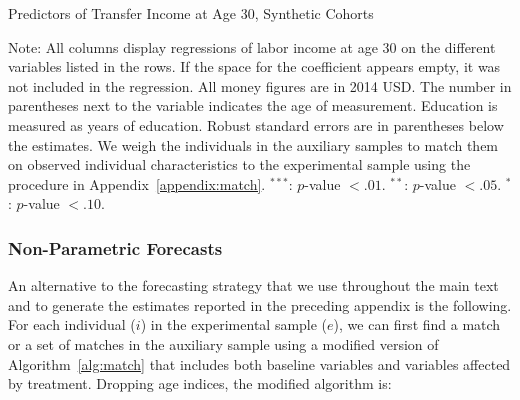 \begin{table}[H]
\begin{threeparttable}
\caption{Predictors of Transfer Income at Age 30, Synthetic Cohorts}
\label{table:predtransferincome}
\centering
\footnotesize

\begin{tablenotes}
\footnotesize
\item Note: All columns display regressions of labor income at age 30 on the different variables listed in the rows. If the space for the coefficient appears empty, it was not included in the regression. All money figures are in 2014 USD. The number in parentheses next to the variable indicates the age of measurement. Education is measured as years of education. Robust standard errors are in parentheses below the estimates. We weigh the individuals in the auxiliary samples to match them on observed individual characteristics to the experimental sample using the procedure in Appendix~\ref{appendix:match}. $^{***}$: $p$-value $< .01$. $^{**}$: $p$-value $< .05$. $^{*}$: $p$-value $< .10$.
\end{tablenotes}
\end{threeparttable}
\end{table}

\subsubsection{Non-Parametric Forecasts} \label{appendix:nonpar}

\noindent An alternative to the forecasting strategy that we use throughout the main text and to generate the estimates reported in the preceding appendix is the following. For each individual ($i$) in the experimental sample ($e$), we can first find a match or a set of matches in the auxiliary sample using a modified version of Algorithm~\ref{alg:match} that includes both baseline variables and variables affected by treatment. Dropping age indices, the modified algorithm is:

